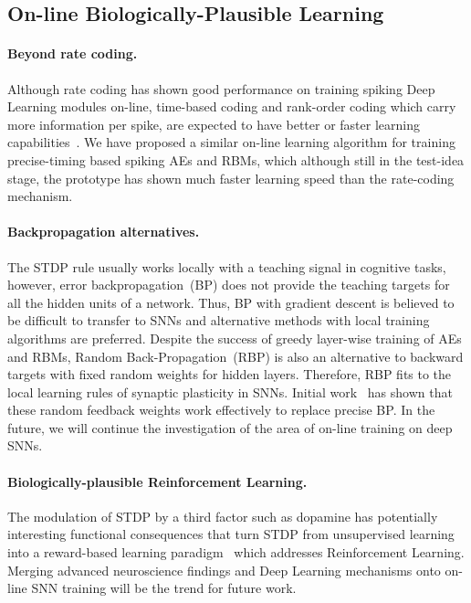 \subsection{On-line Biologically-Plausible Learning}
\DIFaddbegin {}\DIFaddend \paragraph{Beyond rate coding.}
Although rate coding has shown good performance on training spiking Deep Learning modules on-line, time-based coding and rank-order coding which carry more information per spike, are expected to have better or faster learning capabilities~\citep{gautrais1998rate}.
We have proposed a similar on-line learning algorithm for training precise-timing based spiking AEs and RBMs, which although still in the test-idea stage, the prototype has shown much faster learning speed than the rate-coding mechanism.

\paragraph{Backpropagation alternatives.}
The STDP rule usually works locally with a teaching signal in cognitive tasks, however, error backpropagation~(BP) does not provide the teaching targets for all the hidden units of a network.
Thus, BP with gradient descent is believed to be difficult to transfer to SNNs and alternative methods with local training algorithms are preferred.
Despite the success of greedy layer-wise training of AEs and RBMs, Random Back-Propagation~(RBP) is also an alternative to backward targets with fixed random weights for hidden layers.
Therefore, RBP fits to the local learning rules of synaptic plasticity in SNNs.
Initial work~\citep{samadi2017deep,neftci2017event} has shown that these random feedback weights work effectively to replace precise BP.  
In the future, we will continue the investigation of the area of on-line training on deep SNNs.

\paragraph{Biologically-plausible Reinforcement Learning.}
The modulation of STDP by a third factor such as dopamine has potentially interesting functional consequences that turn STDP from unsupervised learning into a reward-based learning paradigm~\citep{izhikevich2007solving} which addresses Reinforcement Learning.
Merging advanced neuroscience findings and Deep Learning mechanisms onto on-line SNN training will be the trend for future work.


